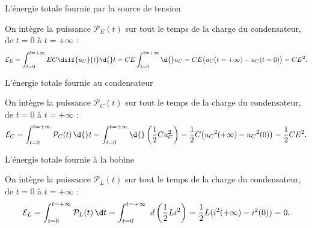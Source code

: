 \begin{enonce}
L'énergie totale fournie par la source de tension
\end{enonce}


\begin{corrige}
On intègre la puissance $\mathcal{P}_E(t)$ sur tout le temps de la charge du condensateur, de $t=0$ à $t=+\infty$ : 
\[
\mathcal{E}_E= \int_{t=0}^{t=+\infty} E C \diff{u_C}{t} \d{} t = CE \int_{t=0}^{t=+\infty} \d{} u_C =CE\big( u_C(t=+\infty) - u_C(t=0)\big)= CE^2.
\]
\end{corrige}




\begin{enonce}
L'énergie totale fournie au condensateur
\end{enonce}


\begin{corrige}
On intègre la puissance $\mathcal{P}_C(t)$ sur tout le temps de la charge du condensateur, de $t=0$ à $t=+\infty$ :
\[
\mathcal{E}_C=\int_{t=0}^{t=+\infty} \mathcal{P}_C(t) \, \d{} t = \int_{t=0}^{t=+\infty} \d{}\left(\frac{1}{2}Cu_C^2 \right) 
= \frac{1}{2}C\big({u_C}^2(+\infty)-{u_C}^2(0)\big)=\frac{1}{2}CE^2.
\]
\end{corrige}




\begin{enonce}
L'énergie totale fournie à la bobine
\end{enonce}


\begin{corrige}
On intègre la puissance $\mathcal{P}_L(t)$ sur tout le temps de la charge du condensateur, de $t=0$ à $t=+\infty$ :
\[
\mathcal{E}_L=\int_{t=0}^{t=+\infty} \mathcal{P}_L(t) \, \d t=\int_{t=0}^{t=+\infty} \ d\left(\frac{1}{2}Li^2 \right) %
=\frac{1}{2}L(i^2(+\infty)-i^2(0))=0.
\]
\end{corrige}






